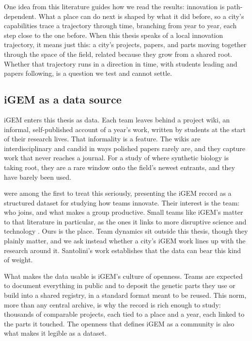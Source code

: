 \documentclass[12pt,a4paper]{article}
\begin{document}
	One idea from this literature guides how we read the results: innovation is
	path-dependent. What a place can do next is shaped by what it did before, so a
	city's capabilities trace a trajectory through time, branching from year to year,
	each step close to the one before. When this thesis speaks of a local innovation
	trajectory, it means just this: a city's projects, papers, and parts moving
	together through the space of the field, related because they grow from a shared
	root. Whether that trajectory runs in a direction in time, with students leading
	and papers following, is a question we test and cannot settle.
	
	\subsection{iGEM as a data source}
	
	iGEM enters this thesis as data. Each team leaves behind a project wiki, an
	informal, self-published account of a year's work, written by students at the
	start of their research lives. That informality is a feature. The wikis are
	interdisciplinary and candid in ways polished papers rarely are, and they capture
	work that never reaches a journal. For a study of where synthetic biology is
	taking root, they are a rare window onto the field's newest entrants, and they
	have barely been used.
	
	\citet{santoliniIGEMModelSystem2023} were among the first to treat this seriously,
	presenting the iGEM record as a structured dataset for studying how teams
	innovate. Their interest is the team: who joins, and what makes a group
	productive. Small teams like iGEM's matter to that literature in particular, as the
	ones it links to more disruptive science and technology
	\citep{wuLargeTeamsDevelop2019}. Ours is the place. Team dynamics sit outside this thesis, though they
	plainly matter, and we ask instead whether a city's iGEM work lines up with the
	research around it. Santolini's work establishes that the data can bear this kind
	of weight.
	
	What makes the data usable is iGEM's culture of openness. Teams are expected to
	document everything in public and to deposit the genetic parts they use or build
	into a shared registry, in a standard format meant to be reused. This norm, more
	than any central archive, is why the record is rich enough to study: thousands of
	comparable projects, each tied to a place and a year, each linked to the parts it
	touched. The openness that defines iGEM as a community is also what makes it
	legible as a dataset.
	
\end{document}
